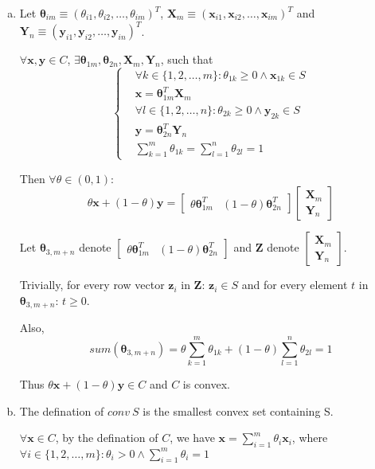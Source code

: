 \documentclass{article}
\def\bx{\boldsymbol{x}}
\def\by{\boldsymbol{y}}
\def\bz{\boldsymbol{z}}
\def\btheta{\boldsymbol{\theta}}
\def\bX{\boldsymbol{X}}
\def\bY{\boldsymbol{Y}}
\def\bZ{\boldsymbol{Z}}
\def\convex#1#2{\theta#1+(1-\theta)#2}
\begin{document}
\begin{enumerate}[(a)]
	\item 
		Let 
		$
		\btheta_{im}
		\equiv
		(\theta_{i1},\theta_{i2},\dots,\theta_{im})^T
		$, $
		\bX_{m}
		\equiv
		(\bx_{i1},\bx_{i2},\dots,\bx_{im})^T
		$ and $
		\bY_{n}
		\equiv
		(\by_{i1},\by_{i2},\dots,\by_{in})^T
		$.

		$\forall \bx,\by\in C$, 
		$\exists \btheta_{1m},\btheta_{2n},\bX_{m},\bY_{n}$,
		such that 
		$$
		\begin{cases}
			&
			\forall k\in\{1,2,\dots,m\}:
			\theta_{1k}\ge0 \land \bx_{1k}\in S
			\\
			&
			\bx=\btheta_{1m}^T\bX_{m}
			\\
			&
			\forall l\in\{1,2,\dots,n\}:
			\theta_{2k}\ge0 \land \by_{2k}\in S
			\\
			&
			\by=\btheta_{2n}^T\bY_{n}
			\\
			&
			\sum_{k=1}^m\theta_{1k}=\sum_{l=1}^n\theta_{2l}=1
		\end{cases}		
		$$

		Then $\forall\theta\in(0,1)$:
		$$
		\convex{\bx}{\by}=
		\begin{bmatrix}
			\theta\btheta_{1m}^T & (1-\theta)\btheta_{2n}^T
		\end{bmatrix}
		\begin{bmatrix}
			\bX_m
			\\
			\bY_n
		\end{bmatrix}
		$$

		Let $\btheta_{3,m+n}$ denote 
		$
		\begin{bmatrix}
			\theta\btheta_{1m}^T & (1-\theta)\btheta_{2n}^T
		\end{bmatrix}
		$ and $\bZ$ denote
		$
		\begin{bmatrix}
			\bX_m
			\\
			\bY_n
		\end{bmatrix}
		$.

		Trivially, for every row vector $\bz_i$ in $\bZ$: $\bz_i\in S$ and for every element $t$ in $\btheta_{3,m+n}$: $t\ge0$.

		Also, $$sum(\btheta_{3,m+n})=
		\theta\sum_{k=1}^m\theta_{1k}
		+
		(1-\theta)\sum_{l=1}^n\theta_{2l}=1
		$$
		
		Thus $\convex{\bx}{\by}\in C$ and $C$ is convex.
	\item
		The defination of $conv\ S$ is the smallest convex set containing S.

		$\forall \bx\in C$, by the defination of $C$, we have
		$\bx=\sum_{i=1}^m\theta_i\bx_i$, where 
		$
		\forall i\in\{1,2,\dots,m\}:\theta_i>0
		\land
		\sum_{i=1}^m\theta_i=1
		$


\end{enumerate}
\end{document}
